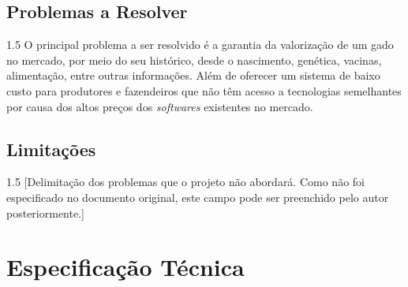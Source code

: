 \documentclass[12pt, a4paper]{article}
\begin{document}
\subsection{Problemas a Resolver}
\begin{spacing}{1.5}
O principal problema a ser resolvido é a garantia da valorização de um gado no mercado, por meio do seu histórico, desde o nascimento, genética, vacinas, alimentação, entre outras informações. Além de oferecer um sistema de baixo custo para produtores e fazendeiros que não têm acesso a tecnologias semelhantes por causa dos altos preços dos \textit{softwares} existentes no mercado.
\end{spacing}

\subsection{Limitações}
\begin{spacing}{1.5}
[Delimitação dos problemas que o projeto não abordará. Como não foi especificado no documento original, este campo pode ser preenchido pelo autor posteriormente.]
\end{spacing}

\section{Especificação Técnica}
\end{document}
